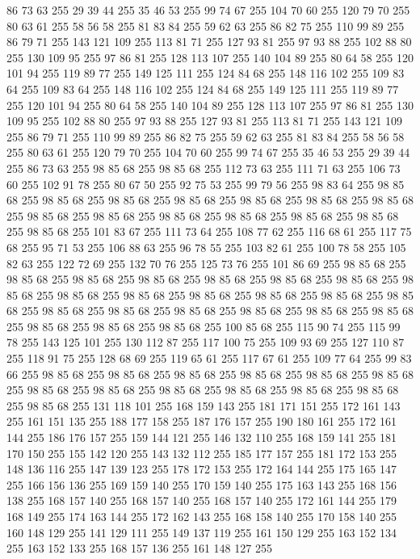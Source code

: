 86 73 63 255 29 39 44 255 35 46 53 255 99 74 67 255 104 70 60 255 120 79 70 255 80 63 61 255 58 56 58 255 81 83 84 255 59 62 63 255 86 82 75 255 110 99 89 255 86 79 71 255 143 121 109 255 113 81 71 255 127 93 81 255 97 93 88 255 102 88 80 255 130 109 95 255 97 86 81 255 128 113 107 255 140 104 89 255 80 64 58 255 120 101 94 255 119 89 77 255 149 125 111 255 124 84 68 255 148 116 102 255 109 83 64 255 109 83 64 255 148 116 102 255 124 84 68 255 149 125 111 255 119 89 77 255 120 101 94 255 80 64 58 255 140 104 89 255 128 113 107 255 97 86 81 255 130 109 95 255 102 88 80 255 97 93 88 255 127 93 81 255 113 81 71 255 143 121 109 255 86 79 71 255 110 99 89 255 86 82 75 255 59 62 63 255 81 83 84 255 58 56 58 255 80 63 61 255 120 79 70 255 104 70 60 255 99 74 67 255 35 46 53 255 29 39 44 255 86 73 63 255 98 85 68 255 98 85 68 255 112 73 63 255 111 71 63 255 106 73 60 255 102 91 78 255
80 67 50 255 92 75 53 255 99 79 56 255 98 83 64 255 98 85 68 255 98 85 68 255 98 85 68 255 98 85 68 255 98 85 68 255 98 85 68 255 98 85 68 255 98 85 68 255 98 85 68 255 98 85 68 255 98 85 68 255 98 85 68 255 98 85 68 255 98 85 68 255 101 83 67 255 111 73 64 255 108 77 62 255 116 68 61 255 117 75 68 255 95 71 53 255 106 88 63 255 96 78 55 255 103 82 61 255 100 78 58 255 105 82 63 255 122 72 69 255 132 70 76 255 125 73 76 255 101 86 69 255 98 85 68 255 98 85 68 255 98 85 68 255 98 85 68 255 98 85 68 255 98 85 68 255 98 85 68 255 98 85 68 255 98 85 68 255 98 85 68 255 98 85 68 255 98 85 68 255 98 85 68 255 98 85 68 255 98 85 68 255 98 85 68 255 98 85 68 255 98 85 68 255 98 85 68 255 98 85 68 255 98 85 68 255 98 85 68 255 98 85 68 255 100 85 68 255 115 90 74 255 115 99 78 255 143 125 101 255 130 112 87 255 117 100 75 255 109 93 69 255 127 110 87 255
118 91 75 255 128 68 69 255 119 65 61 255 117 67 61 255 109 77 64 255 99 83 66 255 98 85 68 255 98 85 68 255 98 85 68 255 98 85 68 255 98 85 68 255 98 85 68 255 98 85 68 255 98 85 68 255 98 85 68 255 98 85 68 255 98 85 68 255 98 85 68 255 98 85 68 255 131 118 101 255 168 159 143 255 181 171 151 255 172 161 143 255 161 151 135 255 188 177 158 255 187 176 157 255 190 180 161 255 172 161 144 255 186 176 157 255 159 144 121 255 146 132 110 255 168 159 141 255 181 170 150 255 155 142 120 255 143 132 112 255 185 177 157 255 181 172 153 255 148 136 116 255 147 139 123 255 178 172 153 255 172 164 144 255 175 165 147 255 166 156 136 255 169 159 140 255 170 159 140 255 175 163 143 255 168 156 138 255 168 157 140 255 168 157 140 255 168 157 140 255 172 161 144 255 179 168 149 255 174 163 144 255 172 162 143 255 168 158 140 255 170 158 140 255 160 148 129 255 141 129 111 255 149 137 119 255 161 150 129 255 163 152 134 255 163 152 133 255 168 157 136 255 161 148 127 255
